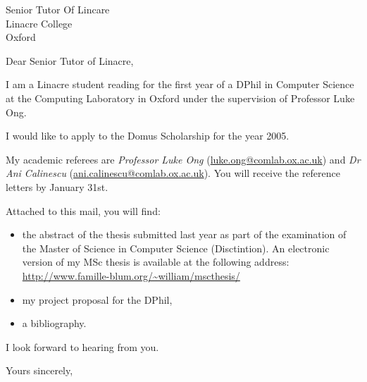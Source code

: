 \documentclass{letter}
\begin{document}
\address{William Blum \\ Linacre College\\ Oxford \\ william.blum@comlab.ox.ac.uk}
\signature{William Blum}
\begin{letter}{Senior Tutor Of Lincare\\ Linacre College\\ Oxford}
\opening{Dear Senior Tutor of Linacre,}

I am a Linacre student reading for the first year of a DPhil in Computer Science at the Computing Laboratory in Oxford under the supervision of Professor Luke Ong.

I would like to apply to the Domus Scholarship for the year 2005.


My academic referees are \textsl{Professor Luke Ong} (\url{luke.ong@comlab.ox.ac.uk}) and \textsl{Dr Ani Calinescu} (\url{ani.calinescu@comlab.ox.ac.uk}). You will receive the reference letters by January 31st.

Attached to this mail, you will find:
\begin{itemize}
\item the abstract of the thesis submitted last year as part of the examination of the Master of Science in Computer Science (Disctintion). An electronic version of my MSc thesis is available at the following address: \url{http://www.famille-blum.org/~william/mscthesis/}

\item my project proposal for the DPhil,
\item a bibliography.
\end{itemize}

I look forward to hearing from you.

\closing{Yours sincerely,}
\end{letter}
\end{document}
